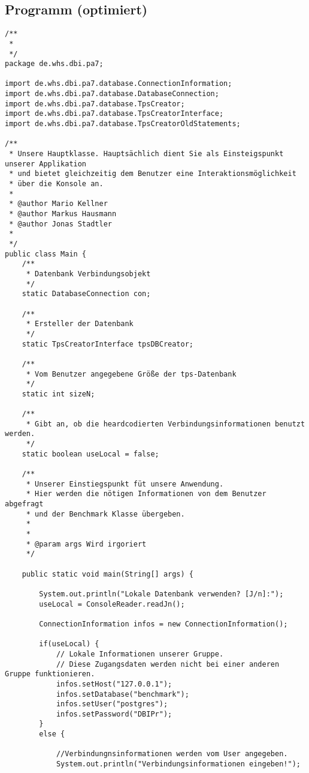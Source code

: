 \subsection{Programm (optimiert)}
\label{app:programmv2}

\begin{lstlisting}[caption={Main (optimiert)}, label={lst:mainv2}]
/**
 * 
 */
package de.whs.dbi.pa7;

import de.whs.dbi.pa7.database.ConnectionInformation;
import de.whs.dbi.pa7.database.DatabaseConnection;
import de.whs.dbi.pa7.database.TpsCreator;
import de.whs.dbi.pa7.database.TpsCreatorInterface;
import de.whs.dbi.pa7.database.TpsCreatorOldStatements;

/**
 * Unsere Hauptklasse. Hauptsächlich dient Sie als Einsteigspunkt unserer Applikation
 * und bietet gleichzeitig dem Benutzer eine Interaktionsmöglichkeit
 * über die Konsole an.
 * 
 * @author Mario Kellner
 * @author Markus Hausmann
 * @author Jonas Stadtler
 *
 */
public class Main {
	/**
	 * Datenbank Verbindungsobjekt
	 */
	static DatabaseConnection con;
	
	/**
	 * Ersteller der Datenbank
	 */
	static TpsCreatorInterface tpsDBCreator;
	
	/**
	 * Vom Benutzer angegebene Größe der tps-Datenbank
	 */
	static int sizeN;
	
	/**
	 * Gibt an, ob die heardcodierten Verbindungsinformationen benutzt werden.
	 */
	static boolean useLocal = false;
	
	/**
	 * Unserer Einstiegspunkt füt unsere Anwendung.
	 * Hier werden die nötigen Informationen von dem Benutzer abgefragt
	 * und der Benchmark Klasse übergeben.
	 * 
	 * 
	 * @param args Wird irgoriert
	 */
	
	public static void main(String[] args) {
		
		System.out.println("Lokale Datenbank verwenden? [J/n]:");
		useLocal = ConsoleReader.readJn();
		
		ConnectionInformation infos = new ConnectionInformation();
		
		if(useLocal) {
			// Lokale Informationen unserer Gruppe.
			// Diese Zugangsdaten werden nicht bei einer anderen Gruppe funktionieren.
			infos.setHost("127.0.0.1");
			infos.setDatabase("benchmark");
			infos.setUser("postgres");
			infos.setPassword("DBIPr");
		}
		else {
			
			//Verbindungnsinformationen werden vom User angegeben.
			System.out.println("Verbindungsinformationen eingeben!");
			

\end{lstlisting}
